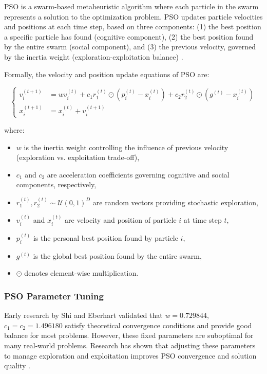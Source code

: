 PSO is a swarm-based metaheuristic algorithm where each particle in the swarm represents a solution to the optimization problem. PSO updates particle velocities and positions at each time step, based on three components: (1) the best position a specific particle has found (cognitive component), (2) the best position found by the entire swarm (social component), and (3) the previous velocity, governed by the inertia weight (exploration-exploitation balance) \cite{Kennedy1995, Bonyadi2015}.

Formally, the velocity and position update equations of PSO are:

\begin{equation}
\begin{cases}
v_i^{(t+1)} &= w v_i^{(t)} + c_1 r_1^{(t)} \odot (p_i^{(t)} - x_i^{(t)}) + c_2 r_2^{(t)} \odot (g^{(t)} - x_i^{(t)}) \\
x_i^{(t+1)} &= x_i^{(t)} + v_i^{(t+1)}
\end{cases}
\label{eq:pso_update}
\end{equation}

where:
\begin{itemize}
\item $w$ is the inertia weight controlling the influence of previous velocity (exploration vs. exploitation trade-off),
\item $c_1$ and $c_2$ are acceleration coefficients governing cognitive and social components, respectively,
\item $r_1^{(t)}, r_2^{(t)} \sim \mathcal{U}(0,1)^D$ are random vectors providing stochastic exploration,
\item $v_i^{(t)}$ and $x_i^{(t)}$ are velocity and position of particle $i$ at time step $t$,
\item $p_i^{(t)}$ is the personal best position found by particle $i$,
\item $g^{(t)}$ is the global best position found by the entire swarm,
\item $\odot$ denotes element-wise multiplication.
\end{itemize}

\subsubsection*{PSO Parameter Tuning}

Early research by Shi and Eberhart \cite{ShiEberhart1998} validated that $w = 0.729844$, $c_1 = c_2 = 1.496180$ satisfy theoretical convergence conditions and provide good balance for most problems. However, these fixed parameters are suboptimal for many real-world problems. Research has shown that adjusting these parameters to manage exploration and exploitation improves PSO convergence and solution quality \cite{Bonyadi2015}.

